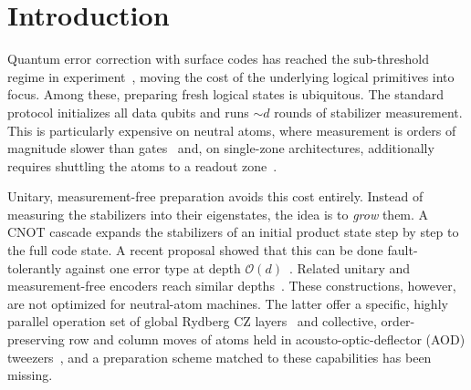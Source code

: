 \documentclass[conference]{IEEEtran}
\newcommand{\bigo}[1]{\mathcal{O}(#1)}
\begin{document}
\section{Introduction}\label{sec:intro}

Quantum error correction with surface codes has reached the sub-threshold
regime in experiment~\cite{acharya2024threshold,bluvstein2024logical}, moving
the cost of the underlying logical primitives into focus. Among these,
preparing fresh logical states is ubiquitous. The standard protocol
initializes all data qubits and runs ${\sim}d$ rounds of stabilizer
measurement. This is particularly expensive on neutral atoms, where
measurement is orders of magnitude slower than
gates~\cite{graham2023midcircuit,bluvstein2024logical} and, on single-zone
architectures, additionally requires shuttling the atoms to a readout
zone~\cite{bluvstein2024logical}.

Unitary, measurement-free preparation avoids this cost entirely. Instead of
measuring the stabilizers into their eigenstates, the idea is to \emph{grow}
them. A CNOT cascade expands the stabilizers of an initial product state
step by step to the full code state. A recent proposal showed that this can
be done fault-tolerantly against one error type at depth
$\bigo{d}$~\cite{ref:unitaryprep,zen2024rl}. Related unitary and
measurement-free encoders reach similar
depths~\cite{higgott2021optimal,tsai2025encoder,goto2023measfree}. These
constructions, however, are not optimized for neutral-atom machines. The
latter offer a specific, highly parallel operation set of
global Rydberg CZ layers~\cite{evered2023gates} and collective,
order-preserving row and column moves of atoms held in
acousto-optic-deflector (AOD) tweezers~\cite{bluvstein2022transport}, and a
preparation scheme matched to these capabilities has been missing.
\end{document}

